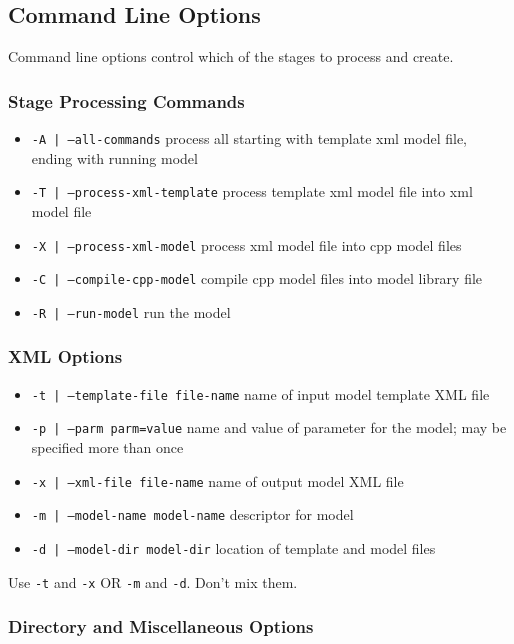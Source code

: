 \documentclass{article}
\newcommand{\inlinecode}[1]{\texttt{#1}}
\begin{document}
\subsection{Command Line Options}

Command line options control which of the stages to process and create.


\subsubsection{Stage Processing Commands}

\begin{itemize}
\item \inlinecode{-A | --all-commands}
  process all starting with template xml model file, ending with running model
\item \inlinecode{-T | --process-xml-template}
  process template xml model file into xml model file
\item \inlinecode{-X | --process-xml-model}
  process xml model file into cpp model files
\item \inlinecode{-C | --compile-cpp-model}
  compile cpp model files into model library file
\item \inlinecode{-R | --run-model}
  run the model
\end{itemize}

\subsubsection{XML Options}

\begin{itemize}
\item \inlinecode{-t | --template-file file-name}
  name of input model template XML file
\item \inlinecode{-p | --parm parm=value}
  name and value of parameter for the model; may be specified more than once
\item \inlinecode{-x | --xml-file file-name}
  name of output model XML file
\item \inlinecode{-m | --model-name model-name}
  descriptor for model
\item \inlinecode{-d | --model-dir model-dir}
  location of template and model files
\end{itemize}

Use \inlinecode{-t} and \inlinecode{-x} OR \inlinecode{-m} and \inlinecode{-d}.  Don't mix them.

\subsubsection{Directory and Miscellaneous Options}
\end{document}
